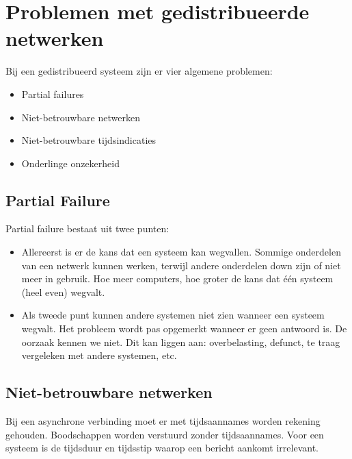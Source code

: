 \documentclass[a4paper,10pt,twoside]{report}
\begin{document}
\section{Problemen met gedistribueerde netwerken}

Bij een gedistribueerd systeem zijn er vier algemene problemen:

\begin{itemize}
	\item Partial failures
	\item Niet-betrouwbare netwerken
	\item Niet-betrouwbare tijdsindicaties
	\item Onderlinge onzekerheid
\end{itemize}

\subsection{Partial Failure}

Partial failure bestaat uit twee punten:

\begin{itemize}
	\item Allereerst is er de kans dat een systeem kan wegvallen. Sommige onderdelen van een netwerk kunnen werken, terwijl andere onderdelen down zijn of niet meer in gebruik. Hoe meer computers, hoe groter de kans dat één systeem (heel even) wegvalt.
	\item Als tweede punt kunnen andere systemen niet zien wanneer een systeem wegvalt. Het probleem wordt pas opgemerkt wanneer er geen antwoord is. De oorzaak kennen we niet. Dit kan liggen aan: overbelasting, defunct, te traag vergeleken met andere systemen, etc.
\end{itemize}

\subsection{Niet-betrouwbare netwerken}

Bij een asynchrone verbinding moet er met tijdsaannames worden rekening gehouden. Boodschappen worden verstuurd zonder tijdsaannames. Voor een systeem is de tijdsduur en tijdsstip waarop een bericht aankomt irrelevant. 
\end{document}
